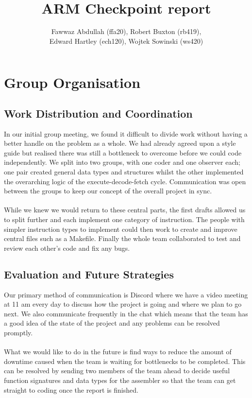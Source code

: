\documentclass[8pt]{article}
\begin{document}
\title{ARM Checkpoint report}
\author{Fawwaz Abdullah (ffa20), Robert Buxton (rb419), \\Edward Hartley (ech120), Wojtek Sowinski (ws420) }

\maketitle

\section{Group Organisation}

\subsection{Work Distribution and Coordination}

In our initial group meeting, we found it difficult to divide work without having a
better handle on the problem as a whole. We had already agreed upon a style guide 
but realised there was still a bottleneck to overcome before we could code independently.
We split into two groups, with one coder and one observer each; one pair created general data
types and structures whilst the other implemented the overarching logic of the execute-decode-fetch cycle.
Communication was open between the groups to keep our concept of the overall project in sync. \\ \\
While we knew we would return to these central parts, the first drafts allowed us to split
further and each implement one category of instruction. The people with simpler instruction types
to implement could then work to create and improve central files such as a Makefile.
Finally the whole team collaborated to test and review each other's code and fix any bugs.

\subsection{Evaluation and Future Strategies}

Our primary method of communication is Discord where we have a video meeting at
11 am every day to discuss how the project is going and where we plan to go next.
We also communicate frequently in the chat which means that the team has a good
idea of the state of the project and any problems can be resolved promptly. \\ \\
What we would like to do in the future is find ways to reduce the amount of
downtime caused when the team is waiting for bottlenecks to be completed. This can be resolved
by sending two members of the team ahead to decide useful function signatures and
data types for the assembler so that the team can get straight to coding once the report is finished.
\end{document}
